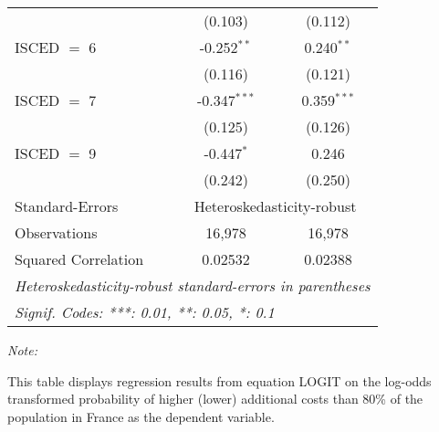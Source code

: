 \begin{table}[htbp!]
\begin{adjustbox}{width = 1\textwidth, max height = 0.95\textheight, center}
\begin{threeparttable}[b]
\begin{tabular}{lcc}
                                 & (0.103)        & (0.112)\\   
            ISCED $=$ 6          & -0.252$^{**}$  & 0.240$^{**}$\\   
                                 & (0.116)        & (0.121)\\   
            ISCED $=$ 7          & -0.347$^{***}$ & 0.359$^{***}$\\   
                                 & (0.125)        & (0.126)\\   
            ISCED $=$ 9          & -0.447$^{*}$   & 0.246\\   
                                 & (0.242)        & (0.250)\\   
            \midrule 
            Standard-Errors & \multicolumn{2}{c}{Heteroskedasticity-robust} \\ 
            Observations         & 16,978         & 16,978\\  
            Squared Correlation  & 0.02532        & 0.02388\\  
            \midrule \midrule
            \multicolumn{3}{l}{\emph{Heteroskedasticity-robust standard-errors in parentheses}}\\
            \multicolumn{3}{l}{\emph{Signif. Codes: ***: 0.01, **: 0.05, *: 0.1}}\\
         \end{tabular}
         
         \begin{tablenotes}\item \medskip \textit{Note:}
            \item This table displays regression results from equation LOGIT on the log-odds transformed probability of higher (lower) additional costs than 80\% of the population in France as the dependent variable. 
         \end{tablenotes}
      \end{threeparttable}
   \end{adjustbox}
\end{table}


